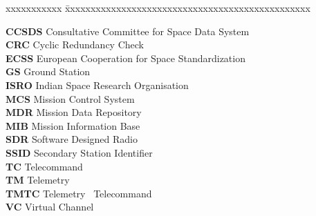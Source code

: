 \documentclass[BTech]{iitmdiss}
\begin{document}
\noindent 
\begin{tabbing}
xxxxxxxxxxx \= xxxxxxxxxxxxxxxxxxxxxxxxxxxxxxxxxxxxxxxxxxxxxxxx \kill

\textbf{CCSDS} \> Consultative Committee for Space Data System  \\
\textbf{CRC} \> Cyclic Redundancy Check \\
\textbf{ECSS} \> European Cooperation for Space Standardization \\
\textbf{GS} \> Ground Station \\
\textbf{ISRO} \> Indian Space Research Organisation \\
\textbf{MCS} \> Mission Control System \\
\textbf{MDR} \> Mission Data Repository \\
\textbf{MIB} \> Mission Information Base \\
\textbf{SDR} \> Software Designed Radio \\
\textbf{SSID} \> Secondary Station Identifier \\
\textbf{TC} \> Telecommand \\
\textbf{TM} \> Telemetry \\
\textbf{TMTC} \> Telemetry \ Telecommand \\
\textbf{VC} \> Virtual Channel \\

\end{tabbing}

\pagebreak


 
 
\end{document}
